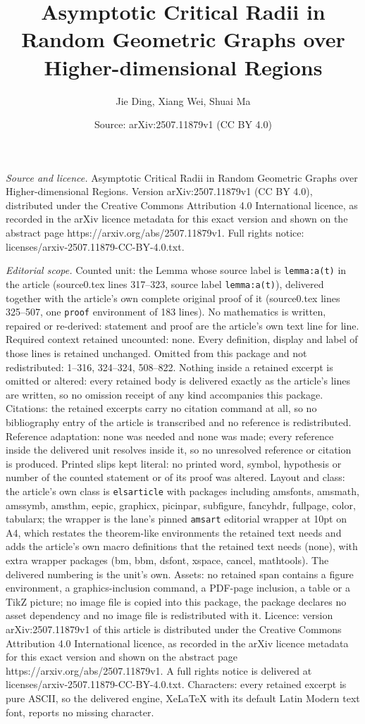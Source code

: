 \documentclass[10pt,a4paper]{amsart}
\title[Asymptotic Critical Radii in Random Geometric Graphs over Hi]{Asymptotic Critical Radii in Random Geometric Graphs over Higher-dimensional Regions}
\author{Jie Ding, Xiang Wei, Shuai Ma}
\date{Source: arXiv:2507.11879v1 (CC BY 4.0)}
\begin{document}
\maketitle

\noindent\emph{Source and licence.} Asymptotic Critical Radii in Random Geometric Graphs over Higher-dimensional Regions. Version arXiv:2507.11879v1 (CC BY 4.0), distributed under the Creative Commons Attribution 4.0 International licence, as recorded in the arXiv licence metadata for this exact version and shown on the abstract page https://arxiv.org/abs/2507.11879v1. Full rights notice: licenses/arxiv-2507.11879-CC-BY-4.0.txt.\par\smallskip

\noindent\textit{Editorial scope.} Counted unit: the Lemma whose source label is \texttt{lemma:a(t)} in the article (source0.tex lines 317--323, source label \texttt{lemma:a(t)}), delivered together with the article's own complete original proof of it (source0.tex lines 325--507, one \texttt{proof} environment of 183 lines). No mathematics is written, repaired or re-derived: statement and proof are the article's own text line for line. Required context retained uncounted: none. Every definition, display and label of those lines is retained unchanged. Omitted from this package and not redistributed: 1--316, 324--324, 508--822. Nothing inside a retained excerpt is omitted or altered: every retained body is delivered exactly as the article's lines are written, so no omission receipt of any kind accompanies this package. Citations: the retained excerpts carry no citation command at all, so no bibliography entry of the article is transcribed and no reference is redistributed. Reference adaptation: none was needed and none was made; every reference inside the delivered unit resolves inside it, so no unresolved reference or citation is produced. Printed slips kept literal: no printed word, symbol, hypothesis or number of the counted statement or of its proof was altered. Layout and class: the article's own class is \texttt{elsarticle} with packages including amsfonts, amsmath, amssymb, amsthm, eepic, graphicx, picinpar, subfigure, fancyhdr, fullpage, color, tabularx; the wrapper is the lane's pinned \texttt{amsart} editorial wrapper at 10pt on A4, which restates the theorem-like environments the retained text needs and adds the article's own macro definitions that the retained text needs (none), with extra wrapper packages (bm, bbm, dsfont, xspace, cancel, mathtools). The delivered numbering is the unit's own. Assets: no retained span contains a figure environment, a graphics-inclusion command, a PDF-page inclusion, a table or a TikZ picture; no image file is copied into this package, the package declares no asset dependency and no image file is redistributed with it. Licence: version arXiv:2507.11879v1 of this article is distributed under the Creative Commons Attribution 4.0 International licence, as recorded in the arXiv licence metadata for this exact version and shown on the abstract page https://arxiv.org/abs/2507.11879v1. A full rights notice is delivered at licenses/arxiv-2507.11879-CC-BY-4.0.txt. Characters: every retained excerpt is pure ASCII, so the delivered engine, XeLaTeX with its default Latin Modern text font, reports no missing character.
\end{document}
